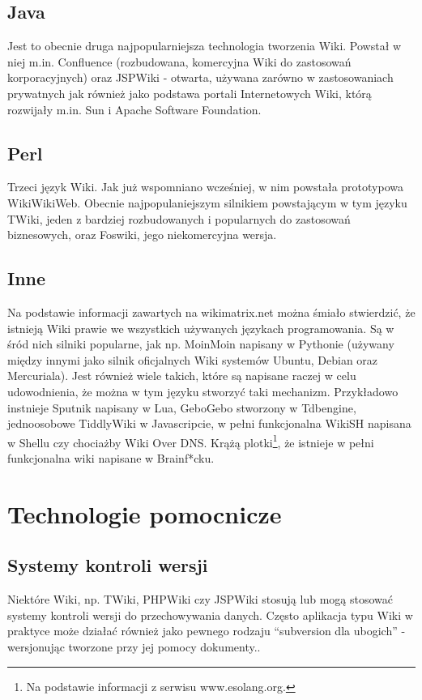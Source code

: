 \documentclass{article}
\begin{document}
	\subsection{Java}
	Jest to obecnie druga najpopularniejsza technologia tworzenia Wiki. Powstał w niej m.in. Confluence (rozbudowana, komercyjna Wiki do zastosowań korporacyjnych) oraz JSPWiki - otwarta, używana zarówno w zastosowaniach prywatnych jak również jako podstawa portali Internetowych Wiki, którą rozwijały m.in. Sun i Apache Software Foundation.
	\subsection{Perl}
	Trzeci język Wiki. Jak już wspomniano wcześniej, w nim powstała prototypowa WikiWikiWeb. Obecnie najpopulaniejszym silnikiem powstającym w tym języku TWiki, jeden z bardziej rozbudowanych i popularnych do zastosowań biznesowych, oraz Foswiki, jego niekomercyjna wersja.  
	\subsection{Inne}
	Na podstawie informacji zawartych na wikimatrix.net można śmiało stwierdzić, że istnieją Wiki prawie we wszystkich używanych językach programowania. Są w śród nich silniki popularne, jak np. MoinMoin napisany w Pythonie (używany między innymi jako silnik oficjalnych Wiki systemów Ubuntu, Debian oraz Mercuriala). Jest również wiele takich, które są napisane raczej w celu udowodnienia, że można w tym języku stworzyć taki mechanizm. Przykładowo instnieje Sputnik napisany w Lua, GeboGebo stworzony w Tdbengine, jednoosobowe TiddlyWiki w Javascripcie, w pełni funkcjonalna WikiSH napisana w Shellu czy chociażby Wiki Over DNS. Krążą plotki\footnote{Na podstawie informacji z serwisu www.esolang.org.}, że istnieje w pełni funkcjonalna wiki napisane w Brainf*cku. 	

\newpage
\section{Technologie pomocnicze}
	\subsection{Systemy kontroli wersji}
	Niektóre Wiki, np. TWiki, PHPWiki czy JSPWiki stosują lub mogą stosować systemy kontroli wersji do przechowywania danych. Często aplikacja typu Wiki w praktyce może działać również jako pewnego rodzaju ``subversion dla ubogich'' - wersjonując tworzone przy jej pomocy dokumenty..  
\end{document}
